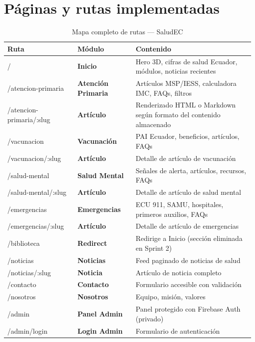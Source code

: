 \documentclass[12pt, a4paper]{article}
\begin{document}
\section{Páginas y rutas implementadas}

\begin{table}[H]
\centering
\caption{Mapa completo de rutas --- SaludEC}
\begin{tabular}{@{}>{\ttfamily\small}p{4.5cm} >{\bfseries}p{3cm} p{5.5cm}@{}}
\toprule
\rowcolor{royalblue!12}
\textbf{Ruta} & \textbf{Módulo} & \textbf{Contenido} \\
\midrule
/ & Inicio & Hero 3D, cifras de salud Ecuador, módulos, noticias recientes \\
/atencion-primaria & Atención Primaria & Artículos MSP/IESS, calculadora IMC, FAQs, filtros \\
/atencion-primaria/:slug & Artículo & Renderizado HTML o Markdown según formato del contenido almacenado \\
/vacunacion & Vacunación & PAI Ecuador, beneficios, artículos, FAQs \\
/vacunacion/:slug & Artículo & Detalle de artículo de vacunación \\
/salud-mental & Salud Mental & Señales de alerta, artículos, recursos, FAQs \\
/salud-mental/:slug & Artículo & Detalle de artículo de salud mental \\
/emergencias & Emergencias & ECU 911, SAMU, hospitales, primeros auxilios, FAQs \\
/emergencias/:slug & Artículo & Detalle de artículo de emergencias \\
/biblioteca & Redirect & Redirige a Inicio (sección eliminada en Sprint 2) \\
/noticias & Noticias & Feed paginado de noticias de salud \\
/noticias/:slug & Noticia & Artículo de noticia completo \\
/contacto & Contacto & Formulario accesible con validación \\
/nosotros & Nosotros & Equipo, misión, valores \\
/admin & Panel Admin & Panel protegido con Firebase Auth (privado) \\
/admin/login & Login Admin & Formulario de autenticación \\
\bottomrule
\end{tabular}
\end{table}
\end{document}
